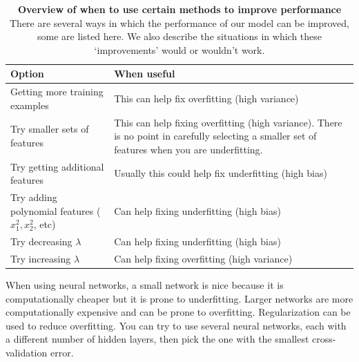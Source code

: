 \documentclass[a4paper, 10pt,hidelinks]{article}
\begin{document}
\begin{table}[h!]
\centering
\begin{tabular}{|p{5.5cm}|p{7.5cm}|}
\hline
Option & When useful \\
\hline
\hline
Getting more training examples & This can help fix overfitting (high variance) \\[0.05cm]
\hline
Try smaller sets of features & This can help fixing overfitting (high variance). There is no point in carefully selecting a smaller set of features when you are underfitting.\\[0.05cm]
\hline
Try getting additional features & Usually this could help fix underfitting (high bias)\\[0.05cm]
\hline
Try adding polynomial features ($x^2_1, x^2_2$, etc) & Can help fixing underfitting (high bias)\\
\hline
Try decreasing $\lambda$ & Can help fixing underfitting (high bias) \\[0.05cm]
\hline
Try increasing $\lambda$ & Can help fixing overfitting (high variance) \\
\hline
\hline
\end{tabular}
\caption{\footnotesize{\textbf{Overview of when to use certain methods to improve performance} There are several ways in which the performance of our model can be improved, some are listed here. We also describe the situations in which these `improvements' would or wouldn't work. }}
\label{Tab: Improving performance}
\end{table}

When using neural networks, a small network is nice because it is computationally cheaper but it is prone to underfitting. Larger networks are more computationally expensive and can be prone to overfitting. Regularization can be used to reduce overfitting. You can try to use several neural networks, each with a different number of hidden layers, then pick the one with the smallest cross-validation error. 
\end{document}
